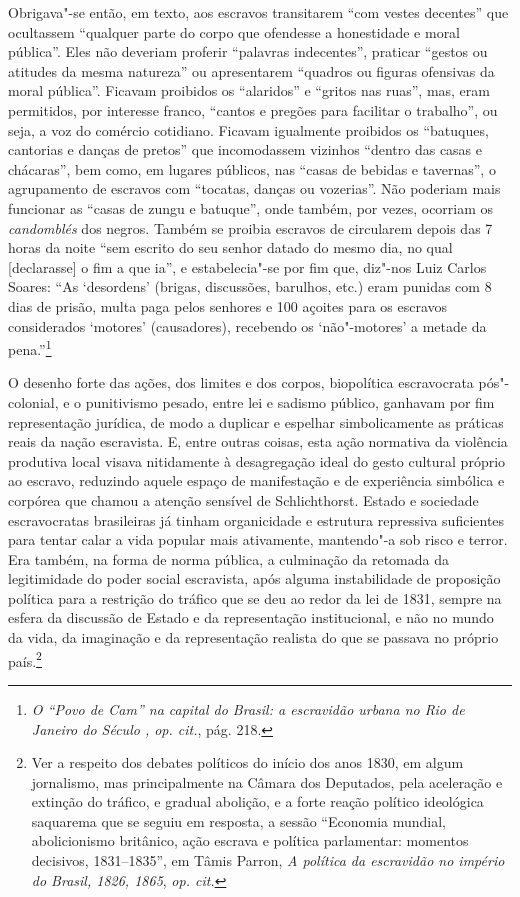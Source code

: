 Obrigava"-se então, em texto, aos escravos transitarem ``com vestes
decentes'' que ocultassem ``qualquer parte do corpo que ofendesse a
honestidade e moral pública''. Eles não deveriam proferir ``palavras
indecentes'', praticar ``gestos ou atitudes da mesma natureza'' ou
apresentarem ``quadros ou figuras ofensivas da moral pública''. Ficavam
proibidos os ``alaridos'' e ``gritos nas ruas'', mas, eram permitidos,
por interesse franco, ``cantos e pregões para facilitar o trabalho'', ou
seja, a voz do comércio cotidiano. Ficavam igualmente proibidos os
``batuques, cantorias e danças de pretos'' que incomodassem vizinhos
``dentro das casas e chácaras'', bem como, em lugares públicos, nas
``casas de bebidas e tavernas'', o agrupamento de escravos com
``tocatas, danças ou vozerias''. Não poderiam mais funcionar as ``casas
de zungu e batuque'', onde também, por vezes, ocorriam os
\emph{candomblés} dos negros. Também se proibia escravos de circularem
depois das 7 horas da noite ``sem escrito do seu senhor datado do mesmo
dia, no qual {[}declarasse{]} o fim a que ia'', e estabelecia"-se por fim
que, diz"-nos Luiz Carlos Soares: ``As `desordens' (brigas, discussões,
barulhos, etc.) eram punidas com 8 dias de prisão, multa paga pelos
senhores e 100 açoites para os escravos considerados `motores'
(causadores), recebendo os `não"-motores' a metade da pena.''\footnote{\emph{O
  ``Povo de Cam'' na capital do Brasil: a escravidão urbana no Rio de
  Janeiro do Século , op. cit.}, pág. 218.}

O desenho forte das ações, dos limites e dos corpos, biopolítica
escravocrata pós"-colonial, e o punitivismo pesado, entre lei e sadismo
público, ganhavam por fim representação jurídica, de modo a duplicar e
espelhar simbolicamente as práticas reais da nação escravista. E, entre
outras coisas, esta ação normativa da violência produtiva local visava
nitidamente à desagregação ideal do gesto cultural próprio ao escravo,
reduzindo aquele espaço de manifestação e de experiência simbólica e
corpórea que chamou a atenção sensível de Schlichthorst. Estado e
sociedade escravocratas brasileiras já tinham organicidade e estrutura
repressiva suficientes para tentar calar a vida popular mais ativamente,
mantendo"-a sob risco e terror. Era também, na forma de norma pública, a
culminação da retomada da legitimidade do poder social escravista, após
alguma instabilidade de proposição política para a restrição do tráfico
que se deu ao redor da lei de 1831, sempre na esfera da discussão de
Estado e da representação institucional, e não no mundo da vida, da
imaginação e da representação realista do que se passava no próprio
país.\footnote{Ver a respeito dos debates políticos do início dos anos
  1830, em algum jornalismo, mas principalmente na Câmara dos Deputados,
  pela aceleração e extinção do tráfico, e gradual abolição, e a forte
  reação político ideológica saquarema que se seguiu em resposta, a
  sessão ``Economia mundial, abolicionismo britânico, ação escrava e
  política parlamentar: momentos decisivos, 1831--1835'', em Tâmis
  Parron, \emph{A política da escravidão no império do Brasil,
  1826, 1865}, \emph{op. cit.}}

